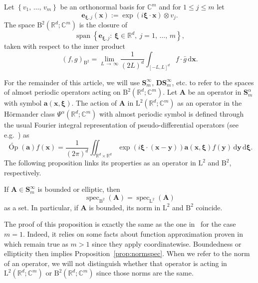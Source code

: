 \documentclass[AHL,Unicode,longabstracts,published]{cedram}
\DeclareMathOperator{\spann}{span}
\DeclareMathOperator{\spec}{spec}
\newcommand{\de}{\, \mathrm{d}}
\newcommand{\RB}{\mathrm{B}}
\newcommand{\RL}{\mathrm{L}}
\newcommand{\R}{\mathbb R}
\newcommand{\C}{\mathbb C}
\newcommand{\bxi}{\boldsymbol \xi}
\newcommand{\ba}{\mathbf a}
\newcommand{\BA}{\mathbf A}
\newcommand{\BD}{\mathbf D}
\newcommand{\BS}{\mathbf S}
\newcommand{\bx}{\mathbf x}
\newcommand{\be}{\mathbf e}
\newcommand{\by}{\mathbf y}
\newcommand{\set}[1]{\left\{ #1 \right\}}
\begin{document}
Let $\set{v_1,\,\dotsc,\,v_m}$ be an orthonormal basis for $\C^m$ and for $1 \le j
\le m$ let
\begin{equation}
\be_{\bxi,j}(\bx):= \exp(i \bxi \cdot \bx) \otimes v_j.
\end{equation}
The space $\RB^2(\R^d;\C^m)$ is the closure of
\begin{equation}
\spann \set{\be_{\bxi,j}:\ \bxi\in\R^d,\ j=1,\,\dots,\,m},
\end{equation}
taken with respect to the inner product
\begin{equation}
(f,g)_{\RB^2} = \lim_{L\,\to\,\infty} \frac{1}{(2L)^d}\int_{[-L,L]^d} f \cdot \bar g \de \bx.
\end{equation}

For the remainder of this article, we will use $\BS_m^\infty$, $\BD\BS_m^\infty$, etc. to refer to the spaces of almost periodic operators acting on $\RB^2(\R^d;\C^m)$. Let $\BA$ be an operator in $\BS_m^\alpha$ with symbol $\ba(\bx,\bxi)$. The action of $\BA$ in $\RL^2(\R^d;\C^m)$ as an operator in the H\"ormander class $\Psi^\alpha(\R^d;\C^m)$ with almost periodic symbol is defined through the usual Fourier integral representation of pseudo-differential operators (see e.g.~\cite{HormanderIII}) as
\[
\widetilde {\operatorname{Op}}(\ba)f(\bx) = \frac{1}{(2\pi)^d}\iint_{\R^d \times \R^d} \exp(i \bxi \cdot(\bx-\by))
\ba(\bx,\bxi) f(\by) \de \by \de \bxi.
\]
The following proposition links its properties as an operator in $\RL^2$ and $\RB^2$, respectively.

\begin{prop}\label{prop:normspec}
If $\BA \in \BS_m^\infty$ is bounded or elliptic, then
\begin{equation}
\spec_{\RB^2}(\BA) = \spec_{\RL^2}(\BA)
\end{equation}
as a set. In particular, if $\BA$ is bounded, its norm in $\RL^2$ and $\RB^2$ coincide.
\end{prop}

The proof of this proposition is exactly the same as the one in~\cite{Shubin1978} for the case $m = 1$. Indeed, it relies on some facts about function approximation proven in~\cite[Lemmata~4.1 and 4.2]{Shubin1978} which remain true as $m > 1$ since they apply coordinatewise. Boundedness or ellipticity then implies Proposition~\ref{prop:normspec}. When we refer to the norm of an operator, we will not distinguish whether that operator is acting in $\RL^2(\R^d;\C^m)$ or $\RB^2(\R^d;\C^m)$ since those norms are the same.
\end{document}
